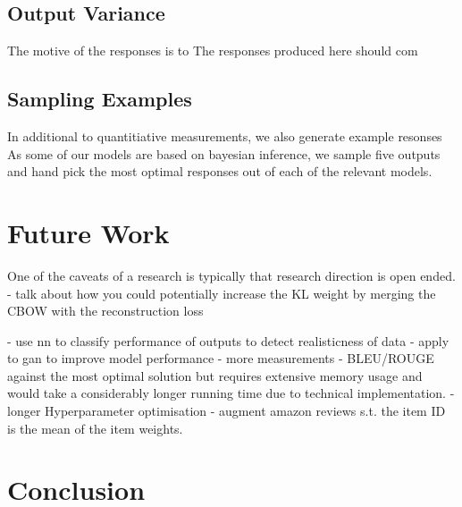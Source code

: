 \documentclass[12pt,twoside]{report}
\begin{document}

\section{Output Variance}

The motive of the responses is to 
The responses produced here should com

\section{Sampling Examples}

In additional to quantitiative measurements, we also generate example resonses 
As some of our models are based on bayesian inference, we sample five outputs and hand pick the most optimal responses out of each of the relevant models. 

\chapter{Future Work}

One of the caveats of a research is typically that research direction is open ended. 
- talk about how you could potentially increase the KL weight by merging the CBOW with the reconstruction loss

- use nn to classify performance of outputs to detect realisticness of data
- apply to gan to improve model performance
- more measurements
- BLEU/ROUGE against the most optimal solution but requires extensive memory usage and would take a considerably longer running time due to technical implementation.
- longer Hyperparameter optimisation
- augment amazon reviews s.t. the item ID is the mean of the item weights.

\chapter{Conclusion}

\end{document}
